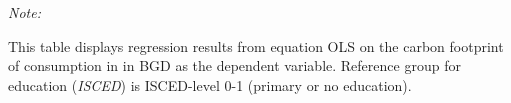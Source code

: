 \begin{table}[htbp!]
\begin{adjustbox}{width = 1\textwidth, max height = 0.95\textheight, center}
\begin{threeparttable}[b]
         \begin{tablenotes}\item \medskip \textit{Note:}
            \item This table displays regression results from equation OLS on the carbon footprint of consumption in  in BGD as the dependent variable.  Reference group for education (\textit{ISCED}) is ISCED-level 0-1 (primary or no education).
         \end{tablenotes}
      \end{threeparttable}
   \end{adjustbox}
\end{table}


